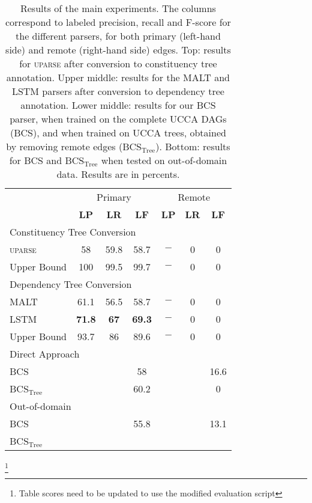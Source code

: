 \documentclass[11pt]{article}
\newcommand{\daniel}[1]{\footnote{\color{blue} #1}}
\begin{document}
\begin{table}[ht]
  \small
\begin{tabular}{l|ccc|ccc}
& \multicolumn{3}{c|}{Primary} & \multicolumn{3}{c}{Remote} \\
& \textbf{LP} & \textbf{LR} & \textbf{LF} & \textbf{LP} & \textbf{LR} & \textbf{LF} \\
\hline
\multicolumn{4}{l}{\footnotesize Constituency Tree Conversion} \\
\textsc{uparse} & 58 & 59.8 & 58.7 & $-$ & 0 & 0 \\
Upper Bound & 100 & 99.5 & 99.7 & $-$ & 0 & 0 \\
\hline
\multicolumn{4}{l}{\footnotesize Dependency Tree Conversion} \\
MALT & 61.1 & 56.5 & 58.7 & $-$ & 0 & 0 \\
LSTM & {\bf 71.8} & {\bf 67} & {\bf 69.3} & $-$ & 0 & 0 \\
Upper Bound & 93.7 & 86 & 89.6 & $-$ & 0 & 0 \\
\hline
\multicolumn{4}{l}{\footnotesize Direct Approach} \\
\textsc{BCS} &  &  & 58 &  &  & 16.6 \\
\textsc{BCS}$_{\mathrm{Tree}}$ &  &  & 60.2 &  &  & 0 \\
\hline
\hline
\multicolumn{4}{l}{\footnotesize Out-of-domain} \\
\textsc{BCS} &  &  & 55.8 &  &  & 13.1 \\
\textsc{BCS}$_{\mathrm{Tree}}$ &  &  &  &  &  &  \\
\end{tabular}
\caption{\small
  Results of the main experiments. The columns correspond to labeled precision,
  recall and F-score for the different parsers, for both primary (left-hand side)
  and remote (right-hand side) edges. Top: results for \textsc{uparse}
  after conversion to constituency tree annotation. Upper middle: results for
  the MALT and LSTM parsers after conversion to dependency tree annotation.
  Lower middle: results for our \textsc{BCS} parser, when trained on the complete UCCA DAGs (\textsc{BCS}),
  and when trained on UCCA trees, obtained by removing remote edges (\textsc{BCS}$_{\mathrm{Tree}}$).
  Bottom: results for \textsc{BCS} and \textsc{BCS}$_{\mathrm{Tree}}$ when tested on out-of-domain data.
  Results are in percents.
}

\label{table:convert}
\end{table}
\daniel{Table scores need to be updated to use the modified evaluation script}
\end{document}
